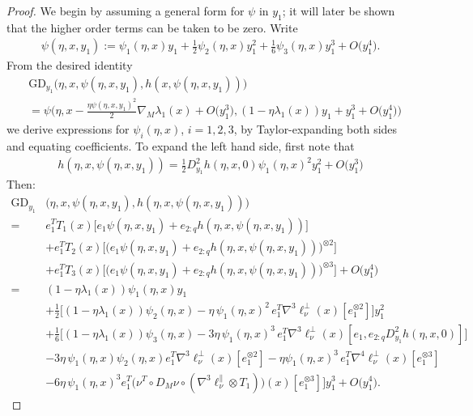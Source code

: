 \documentclass{article}
\newcommand{\GD}{\mathrm{GD}}
\theoremstyle{plain}
\theoremstyle{definition}
\theoremstyle{remark}
\begin{document}
\begin{proof}
    We begin by assuming a general form for $\psi$ in $y_1$; it will later be shown that the higher order terms can be taken to be zero. Write
    \begin{align}
    \psi(\eta,x,y_1):=\psi_1(\eta,x)y_1 + \frac{1}{2}\psi_2(\eta,x) y_1^2 + \frac{1}{6}\psi_3(\eta,x) y_1^3 + O\big( y_1^4\big).
    \end{align}
    From the desired identity
    \begin{align}
    &\GD_{y_1}\big(\eta,x,\psi(\eta,x,y_1),h(x,\psi(\eta,x,y_1))\big)\nonumber\\& = \psi\big(\eta,x - \frac{\eta\psi(\eta,x,y_1)^2}{2}\nabla_M\lambda_1(x) + O\big( y_1^3\big),(1-\eta\lambda_1(x))y_1 +  y_1^3 + O\big( y_1^4\big)\big)
    \end{align}
    we derive expressions for $\psi_i(\eta,x)$, $i=1,2,3$, by Taylor-expanding both sides and equating coefficients. To expand the left hand side, first note that
    \begin{align}
        h(\eta,x,\psi(\eta,x,y_1))= \frac{1}{2}D^2_{y_1}h(\eta,x,0)\psi_1(\eta,x)^2 y_1^2+ O\big( y_1^3\big)
    \end{align}
    Then:
    \begin{align}
        \GD_{y_1}&\big(\eta,x,\psi(\eta,x,y_1),h(\eta,x,\psi(\eta,x,y_1))\big)\\=&e_1^TT_1(x)\big[e_1\psi(\eta,x,y_1) + e_{2:q}h(\eta,x,\psi(\eta,x,y_1))\big]\\&+e_1^TT_2(x)\big[\big(e_1\psi(\eta,x,y_1) + e_{2:q}h(\eta,x,\psi(\eta,x,y_1))\big)^{\otimes 2}\big]\\&+e_1^TT_3(x)\big[\big(e_1\psi(\eta,x,y_1) + e_{2:q}h(\eta,x,\psi(\eta,x,y_1))\big)^{\otimes 3}\big] + O\big( y_1^4\big)\\=&(1-\eta\lambda_1(x))\psi_1(\eta,x)y_1\\&+\frac{1}{2}\big[(1-\eta\lambda_1(x))\psi_2(\eta,x)-\eta\,\psi_1(\eta,x)^2\,e_1^T\nabla^3\ell_{\nu}^{\perp}(x)[e_1^{\otimes 2}]\big] y_1^2\\&+\frac{1}{6}\big[(1-\eta\lambda_1(x))\psi_3(\eta,x) - 3\eta\,\psi_1(\eta,x)^3\,e_1^T\nabla^3\ell^{\perp}_{\nu}(x)[e_1,e_{2:q}D^2_{y_1}h(\eta,x,0)]]\\&-3\eta\,\psi_1(\eta,x)\psi_2(\eta,x)e_1^T\nabla^3\ell^{\perp}_{\nu}(x)[e_1^{\otimes 2}]-\eta\psi_1(\eta,x)^3\,e_1^T\nabla^4\ell^{\perp}_{\nu}(x)[e_1^{\otimes 3}]\\&-6\eta\,\psi_1(\eta,x)^3 e_1^T\big(\nu^T\circ D_M\nu\circ (\nabla^3\ell^{\parallel}_{\nu}\otimes T_1)\big)(x)[e_1^{\otimes3}]\big] y_1^3 + O\big( y_1^4\big).

\end{align}
\end{proof}
\end{document}
